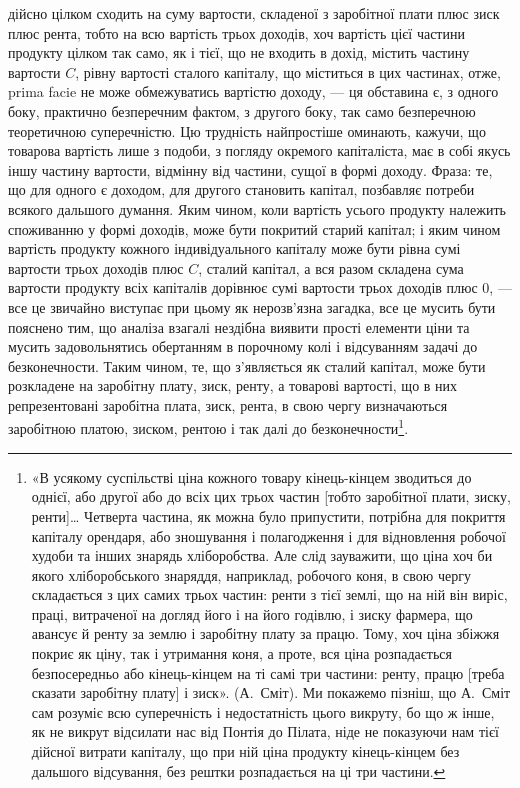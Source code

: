 \parcont{}  %
дійсно цілком сходить на суму вартости, складеної з заробітної плати плюс
зиск плюс рента, тобто на всю вартість трьох доходів, хоч вартість цієї частини
продукту цілком так само, як і тієї, що не входить в дохід, містить частину
вартости \deq{} $C$, рівну вартості сталого капіталу, що міститься в цих частинах,
отже, prima facie не може обмежуватись вартістю доходу, — ця обставина є, з одного
боку, практично безперечним фактом, з другого боку, так само безперечною
теоретичною суперечністю. Цю трудність найпростіше оминають, кажучи, що
товарова вартість лише з подоби, з погляду окремого капіталіста, має в собі
якусь іншу частину вартости, відмінну від частини, сущої в формі доходу.
Фраза: те, що для одного є доходом, для другого становить капітал, позбавляє
потреби всякого дальшого думання. Яким чином, коли вартість усього продукту
належить споживанню у формі доходів, може бути покритий старий капітал; і
яким чином вартість продукту кожного індивідуального капіталу може бути
рівна сумі вартости трьох доходів плюс $C$, сталий капітал, а вся разом складена
сума вартости продукту всіх капіталів дорівнює сумі вартости трьох доходів
плюс 0, — все це звичайно виступає при цьому як нерозв’язна загадка, все це
мусить бути пояснено тим, що аналіза взагалі нездібна виявити прості елементи
ціни та мусить задовольнятись обертанням в порочному колі і відсуванням
задачі до безконечности. Таким чином, те, що з’являється як сталий капітал,
може бути розкладене на заробітну плату, зиск, ренту, а товарові вартості,
що в них репрезентовані заробітна плата, зиск, рента, в свою чергу визначаються
заробітною платою, зиском, рентою і так далі до безконечности\footnote{
«В усякому суспільстві ціна кожного товару кінець-кінцем зводиться до однієї, або другої або до
всіх цих трьох частин [тобто заробітної плати, зиску, ренти]\dots{} Четверта частина, як можна було
припустити, потрібна для покриття капіталу орендаря, або зношування і полагодження і для відновлення
робочої худоби та інших знарядь хліборобства. Але слід зауважити, що ціна хоч би якого
хліборобського знаряддя, наприклад, робочого коня, в свою чергу складається з цих самих трьох
частин: ренти
з тієї землі, що на ній він виріс, праці, витраченої на догляд його і на його годівлю, і зиску
фармера, що авансує й ренту за землю і заробітну плату за працю. Тому, хоч ціна збіжжя покриє як
ціну, так і утримання коня, а проте, вся ціна розпадається безпосередньо або кінець-кінцем на ті
самі три частини: ренту, працю [треба сказати заробітну плату] і зиск». (А.~Сміт). Ми покажемо
пізніш, що А.~Сміт сам розуміє всю суперечність і недостатність цього викруту, бо що ж інше, як не
викрут відсилати
нас від Понтія до Пілата, ніде не показуючи нам тієї дійсної витрати капіталу, що при ній ціна
продукту кінець-кінцем без дальшого відсування, без рештки розпадається на ці три частини.
}.

